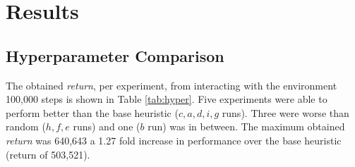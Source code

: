 \documentclass[
  12pt,
  openany]{book}
\begin{document}
\hypertarget{results}{%
\section{Results}\label{results}}

\hypertarget{hyperparameter-comparison}{%
\subsection{Hyperparameter Comparison}\label{hyperparameter-comparison}}

The obtained \emph{return}, per experiment, from interacting with the environment 100,000 steps is shown in Table \ref{tab:hyper}. Five experiments were able to perform better than the base heuristic (\(c,a,d,i,g\) runs). Three were worse than random (\(h,f,e\) runs) and one (\(b\) run) was in between. The maximum obtained \emph{return} was 640,643 a 1.27 fold increase in performance over the base heuristic (return of 503,521).
\end{document}
